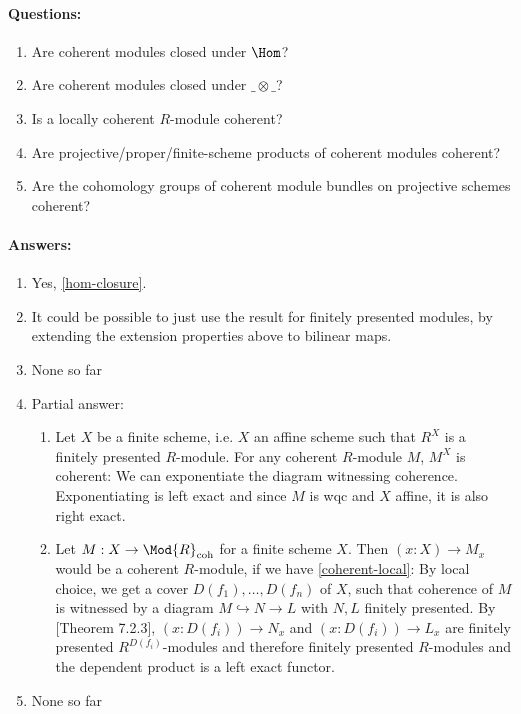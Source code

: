 \paragraph{Questions:}
\begin{enumerate}
\item Are coherent modules closed under $\Hom$?
\item Are coherent modules closed under $\_\otimes\_$?
\item \label{coherent-local} Is a locally coherent $R$-module coherent?
\item Are projective/proper/finite-scheme products of coherent modules coherent?
\item Are the cohomology groups of coherent module bundles on projective schemes coherent?
\end{enumerate}

\paragraph{Answers:}
\begin{enumerate}
\item Yes, \cref{hom-closure}.
\item It could be possible to just use the result for finitely presented modules, by extending the extension properties above to bilinear maps.
\item None so far
\item Partial answer:
\begin{enumerate}
\item Let $X$ be a finite scheme, i.e. $X$ an affine scheme such that $R^X$ is a finitely presented $R$-module.
  For any coherent $R$-module $M$, $M^X$ is coherent: We can exponentiate the diagram witnessing coherence.
  Exponentiating is left exact and since $M$ is wqc and $X$ affine, it is also right exact.
\item Let $M:X\to \Mod{R}_{\mathrm{coh}}$ for a finite scheme $X$. Then $(x:X)\to M_x$ would be a coherent $R$-module, if we have \cref{coherent-local}: By local choice, we get a cover $D(f_1),\dots,D(f_n)$ of $X$, such that coherence of $M$ is witnessed by a diagram $M\hookrightarrow N \to L$ with $N,L$ finitely presented. By \cite{draft}[Theorem 7.2.3], $(x:D(f_i))\to N_x$ and $(x:D(f_i))\to L_x$ are finitely presented $R^{D(f_i)}$-modules and therefore finitely presented $R$-modules and the dependent product is a left exact functor.
\end{enumerate}
\item None so far
\end{enumerate}
